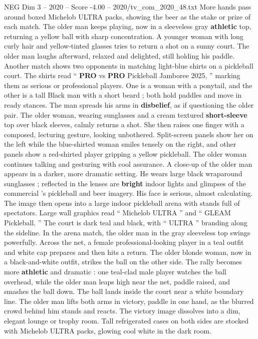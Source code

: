 \begin{textsample}{NEG Dim 3 – 2020 – Score -4.00 – 2020/tv\_com\_2020\_48.txt}
More hands pass around boxed Michelob ULTRA packs, showing the beer as the stake or prize of each match.
The older man keeps playing, now in a sleeveless gray \textbf{athletic} top, returning a yellow ball with sharp concentration.
A younger woman with long curly hair and yellow-tinted glasses tries to return a shot on a sunny court.
The older man laughs afterward, relaxed and delighted, still holding his paddle.
Another match shows two opponents in matching light-blue shirts on a pickleball court.
The shirts read “ \textbf{PRO} vs \textbf{PRO} Pickleball Jamboree 2025, ” marking them as serious or professional players.
One is a woman with a ponytail, and the other is a tall Black man with a short beard ; both hold paddles and move in ready stances.
The man spreads his arms in \textbf{disbelief}, as if questioning the older pair.
The older woman, wearing sunglasses and a cream textured \textbf{short-sleeve} top over black sleeves, calmly returns a shot.
She then raises one finger with a composed, lecturing gesture, looking unbothered.
Split-screen panels show her on the left while the blue-shirted woman smiles tensely on the right, and other panels show a red-shirted player gripping a yellow pickleball.
The older woman continues talking and gesturing with cool assurance.
A close-up of the older man appears in a darker, more dramatic setting.
He wears large black wraparound sunglasses ; reflected in the lenses are \textbf{bright} indoor lights and glimpses of the commercial ’s pickleball and beer imagery.
His face is serious, almost calculating.
The image then opens into a large indoor pickleball arena with stands full of spectators.
Large wall graphics read “ Michelob ULTRA ” and “ GLEAM Pickleball. ” The court is dark teal and black, with “ ULTRA ” branding along the sideline.
In the arena match, the older man in the gray sleeveless top swings powerfully.
Across the net, a female professional-looking player in a teal outfit and white cap prepares and then hits a return.
The older blonde woman, now in a black-and-white outfit, strikes the ball on the other side.
The rally becomes more \textbf{athletic} and dramatic : one teal-clad male player watches the ball overhead, while the older man leaps high near the net, paddle raised, and smashes the ball down.
The ball lands inside the court near a white boundary line.
The older man lifts both arms in victory, paddle in one hand, as the blurred crowd behind him stands and reacts.
The victory image dissolves into a dim, elegant lounge or trophy room.
Tall refrigerated cases on both sides are stocked with Michelob ULTRA packs, glowing cool white in the dark room.

\end{textsample}
